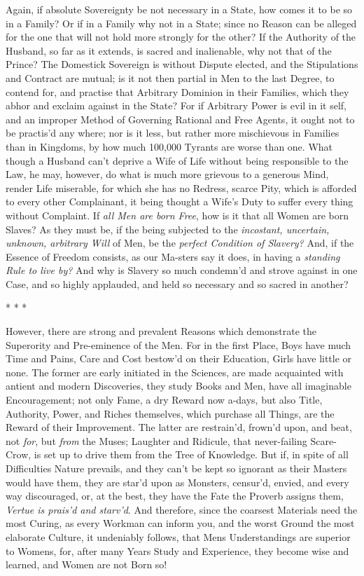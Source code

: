 Again, if absolute Sovereignty be not necessary in a State, how comes
it to be so in a Family? Or if in a Family why not in a State; since
no Reason can be alleged for the one that will not hold more strongly
for the other? If the Authority of the Husband, so far as it extends,
is sacred and inalienable, why not that of the Prince? The Domestick
Sovereign is without Dispute elected, and the Stipulations and
Contract are mutual; is it not then partial in Men to the last Degree,
to contend for, and practise  that Arbitrary Dominion in
their Families, which they abhor and exclaim against in the State? For
if Arbitrary Power is evil in it self, and an improper Method of
Governing Rational and Free Agents, it ought not to be practis'd any
where; nor is it less, but rather more mischievous in Families than in
Kingdoms, by how much 100,000 Tyrants are worse than one. What though
a Husband can't deprive a Wife of Life without being responsible to
the Law, he may, however, do what is much more grievous to a generous
Mind, render Life miserable, for which she has no Redress, scarce
Pity, which is afforded to every other Complainant, it being thought a
Wife's Duty to suffer every thing without Complaint. If \textit{all
Men are born Free}, how is it that all Women are born Slaves? As they
must be, if the being subjected to the \textit{incostant, uncertain,
unknown, arbitrary Will} of Men, be the \textit{perfect Condition of
Slavery?} And, if the Essence of Freedom consists, as our
Ma-sters say it does, in having a \textit{standing Rule to
live by?} And why is Slavery so much condemn'd and strove against in
one Case, and so highly applauded, and held so necessary and so sacred
in another?

\begin{center}* * *\end{center}

However, there are strong and prevalent Reasons which
demonstrate the Superority and Pre-eminence of the Men.  For
in the first Place, Boys have much Time and Pains, Care and Cost
bestow'd on their Education, Girls have little or none. The former are
early initiated in the Sciences, are made acquainted with antient and
modern Discoveries, they study Books and Men, have all imaginable
Encouragement; not only Fame, a dry Reward now a-days, but also Title,
Authority, Power, and Riches themselves, which purchase all Things,
are the Reward of their Improvement. The latter are restrain'd,
frown'd upon, and beat, not \textit{for}, but \textit{from} the Muses;
Laughter and Ridicule, that never-failing Scare-Crow, is set up to
drive them from the Tree of Knowledge. But if, in spite of all
Difficulties Nature prevails, and they can't be kept so ignorant as
their Masters would have them, they are star'd upon as Monsters,
censur'd, envied, and every way discouraged, or, at the best, they
have the Fate the Proverb assigns them, \textit{Vertue is prais'd and
starv'd}. And therefore, since the coarsest  Materials need
the most Curing, as every Workman can inform you, and the worst Ground
the most elaborate Culture, it undeniably follows, that Mens
Understandings are superior to Womens, for, after many Years Study and
Experience, they become wise and learned, and Women are not Born so!

